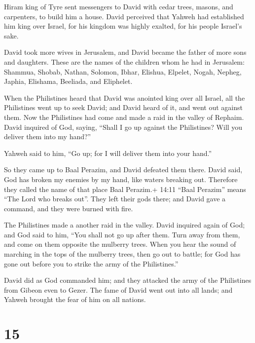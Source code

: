 Hiram king of Tyre sent messengers to David with cedar
trees, masons, and carpenters, to build him a house.  David
perceived that Yahweh had established him king over Israel, for his
kingdom was highly exalted, for his people Israel's sake.

 David took more wives in Jerusalem, and David became the
father of more sons and daughters.  These are the names of
the children whom he had in Jerusalem: Shammua, Shobab, Nathan, Solomon,
 Ibhar, Elishua, Elpelet,  Nogah, Nepheg,
Japhia,  Elishama, Beeliada, and Eliphelet.

 When the Philistines heard that David was anointed king
over all Israel, all the Philistines went up to seek David; and David
heard of it, and went out against them.  Now the Philistines
had come and made a raid in the valley of Rephaim.  David
inquired of God, saying, ``Shall I go up against the Philistines? Will
you deliver them into my hand?''

Yahweh said to him, ``Go up; for I will deliver them into your hand.''

 So they came up to Baal Perazim, and David defeated them
there. David said, God has broken my enemies by my hand, like waters
breaking out. Therefore they called the name of that place Baal
Perazim.+ 14:11 ``Baal Perazim'' means ``The Lord who breaks out''.
 They left their gods there; and David gave a command, and
they were burned with fire.

 The Philistines made a another raid in the valley.
 David inquired again of God; and God said to him, ``You
shall not go up after them. Turn away from them, and come on them
opposite the mulberry trees.  When you hear the sound of
marching in the tops of the mulberry trees, then go out to battle; for
God has gone out before you to strike the army of the Philistines.''

 David did as God commanded him; and they attacked the army
of the Philistines from Gibeon even to Gezer.  The fame of
David went out into all lands; and Yahweh brought the fear of him on all
nations.

\hypertarget{section-14}{%
\section{15}\label{section-14}}

